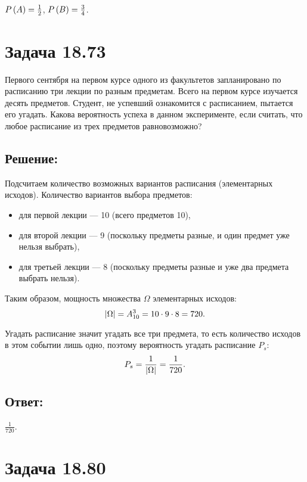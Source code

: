 $P \left ( A \right ) = \frac{1}{2}$, $P \left ( B \right ) = \frac{3}{4}$.

\section*{Задача 18.73}

Первого сентября на первом курсе одного из факультетов запланировано по расписанию три лекции по разным предметам. Всего на первом курсе изучается десять предметов. Студент,
не успевший ознакомится с расписанием, пытается его угадать. Какова вероятность успеха в данном эксперименте, если считать, что любое расписание из трех предметов равновозможно?

\subsection*{Решение:}

Подсчитаем количество возможных вариантов расписания (элементарных исходов). Количество вариантов выбора предметов:
\begin{itemize}
    \item для первой лекции --- 10 (всего предметов 10),
    \item для второй лекции --- 9 (поскольку предметы разные, и один предмет уже нельзя выбрать),
    \item для третьей лекции --- 8 (поскольку предметы разные и уже два предмета выбрать нельзя).
\end{itemize}
Таким образом, мощность множества $\Omega$ элементарных исходов:
\begin{equation}
    \left | \Omega \right | = A_{10}^3 = 10 \cdot 9 \cdot 8 = 720 .
\end{equation}

Угадать расписание значит угадать все три предмета, то есть количество исходов в этом событии лишь одно, поэтому вероятность угадать расписание $P_s$:
\begin{equation}
    P_s = \frac{1}{\left | \Omega \right |} = \frac{1}{720} .
\end{equation}

\subsection*{Ответ:}
$\frac{1}{720}$.

\section*{Задача 18.80}

